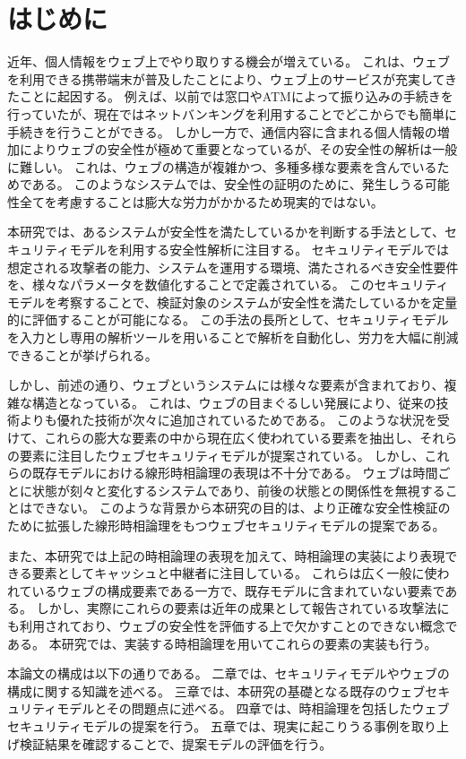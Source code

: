 \chapter{はじめに}
近年、個人情報をウェブ上でやり取りする機会が増えている。
これは、ウェブを利用できる携帯端末が普及したことにより、ウェブ上のサービスが充実してきたことに起因する。
例えば、以前では窓口やATMによって振り込みの手続きを行っていたが、現在ではネットバンキングを利用することでどこからでも簡単に手続きを行うことができる。
しかし一方で、通信内容に含まれる個人情報の増加によりウェブの安全性が極めて重要となっているが、その安全性の解析は一般に難しい。
これは、ウェブの構造が複雑かつ、多種多様な要素を含んでいるためである。
このようなシステムでは、安全性の証明のために、発生しうる可能性全てを考慮することは膨大な労力がかかるため現実的ではない。

本研究では、あるシステムが安全性を満たしているかを判断する手法として、セキュリティモデルを利用する安全性解析に注目する。
セキュリティモデルでは想定される攻撃者の能力、システムを運用する環境、満たされるべき安全性要件を、様々なパラメータを数値化することで定義されている。
このセキュリティモデルを考察することで、検証対象のシステムが安全性を満たしているかを定量的に評価することが可能になる。
この手法の長所として、セキュリティモデルを入力とし専用の解析ツールを用いることで解析を自動化し、労力を大幅に削減できることが挙げられる。

しかし、前述の通り、ウェブというシステムには様々な要素が含まれており、複雑な構造となっている。
これは、ウェブの目まぐるしい発展により、従来の技術よりも優れた技術が次々に追加されているためである。
このような状況を受けて、これらの膨大な要素の中から現在広く使われている要素を抽出し、それらの要素に注目したウェブセキュリティモデルが提案されている\cite{webmodel,cookie-model}。
しかし、これらの既存モデルにおける線形時相論理の表現は不十分である。
ウェブは時間ごとに状態が刻々と変化するシステムであり、前後の状態との関係性を無視することはできない。
このような背景から本研究の目的は、より正確な安全性検証のために拡張した線形時相論理をもつウェブセキュリティモデルの提案である。

また、本研究では上記の時相論理の表現を加えて、時相論理の実装により表現できる要素としてキャッシュと中継者に注目している。
これらは広く一般に使われているウェブの構成要素である一方で、既存モデルに含まれていない要素である。
しかし、実際にこれらの要素は近年の成果として報告されている攻撃法にも利用されており、ウェブの安全性を評価する上で欠かすことのできない概念である。
本研究では、実装する時相論理を用いてこれらの要素の実装も行う。

本論文の構成は以下の通りである。
二章では、セキュリティモデルやウェブの構成に関する知識を述べる。
三章では、本研究の基礎となる既存のウェブセキュリティモデルとその問題点に述べる。
四章では、時相論理を包括したウェブセキュリティモデルの提案を行う。
五章では、現実に起こりうる事例を取り上げ検証結果を確認することで、提案モデルの評価を行う。